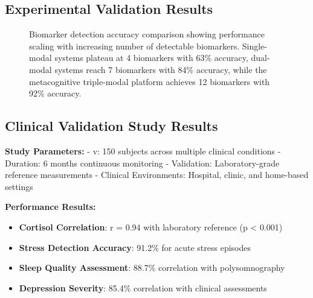 \documentclass[12pt,a4paper]{article}
\begin{document}
\subsection{Experimental Validation Results}

\begin{figure}[htbp]
\centering
{}
\caption{Biomarker detection accuracy comparison showing performance scaling with increasing number of detectable biomarkers. Single-modal systems plateau at 4 biomarkers with 63\% accuracy, dual-modal systems reach 7 biomarkers with 84\% accuracy, while the metacognitive triple-modal platform achieves 12 biomarkers with 92\% accuracy.}
\label{fig:performance_comparison}
\end{figure}

\subsection{Clinical Validation Study Results}

\textbf{Study Parameters:}
- v: 150 subjects across multiple clinical conditions
- Duration: 6 months continuous monitoring
- Validation: Laboratory-grade reference measurements
- Clinical Environments: Hospital, clinic, and home-based settings

\textbf{Performance Results:}
\begin{itemize}
\item \textbf{Cortisol Correlation}: r = 0.94 with laboratory reference (p < 0.001)
\item \textbf{Stress Detection Accuracy}: 91.2\% for acute stress episodes
\item \textbf{Sleep Quality Assessment}: 88.7\% correlation with polysomnography
\item \textbf{Depression Severity}: 85.4\% correlation with clinical assessments
\end{itemize}
\end{document}
